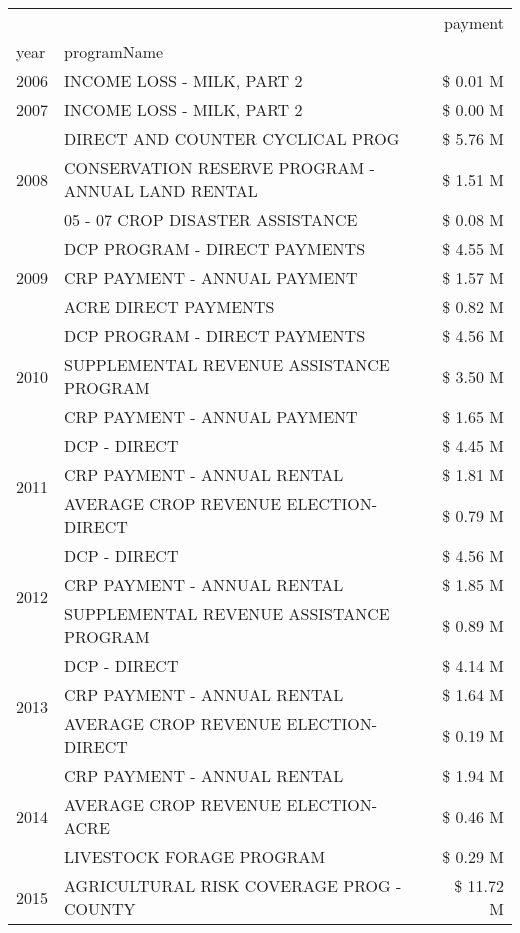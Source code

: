 \begin{tabular}{llr}
\toprule
 &  & payment \\
year & programName &  \\
\midrule
2006 & INCOME LOSS - MILK, PART 2 & \$ 0.01 M \\
\cline{1-3}
2007 & INCOME LOSS - MILK, PART 2 & \$ 0.00 M \\
\cline{1-3}
\multirow[t]{3}{*}{2008} & DIRECT AND COUNTER CYCLICAL PROG & \$ 5.76 M \\
 & CONSERVATION RESERVE PROGRAM - ANNUAL LAND RENTAL & \$ 1.51 M \\
 & 05 - 07 CROP DISASTER ASSISTANCE & \$ 0.08 M \\
\cline{1-3}
\multirow[t]{3}{*}{2009} & DCP PROGRAM - DIRECT PAYMENTS & \$ 4.55 M \\
 & CRP PAYMENT - ANNUAL PAYMENT & \$ 1.57 M \\
 & ACRE DIRECT PAYMENTS & \$ 0.82 M \\
\cline{1-3}
\multirow[t]{3}{*}{2010} & DCP PROGRAM - DIRECT PAYMENTS & \$ 4.56 M \\
 & SUPPLEMENTAL REVENUE ASSISTANCE PROGRAM & \$ 3.50 M \\
 & CRP PAYMENT - ANNUAL PAYMENT & \$ 1.65 M \\
\cline{1-3}
\multirow[t]{3}{*}{2011} & DCP - DIRECT & \$ 4.45 M \\
 & CRP PAYMENT - ANNUAL RENTAL & \$ 1.81 M \\
 & AVERAGE CROP REVENUE ELECTION-DIRECT & \$ 0.79 M \\
\cline{1-3}
\multirow[t]{3}{*}{2012} & DCP - DIRECT & \$ 4.56 M \\
 & CRP PAYMENT - ANNUAL RENTAL & \$ 1.85 M \\
 & SUPPLEMENTAL REVENUE ASSISTANCE PROGRAM & \$ 0.89 M \\
\cline{1-3}
\multirow[t]{3}{*}{2013} & DCP - DIRECT & \$ 4.14 M \\
 & CRP PAYMENT - ANNUAL RENTAL & \$ 1.64 M \\
 & AVERAGE CROP REVENUE ELECTION-DIRECT & \$ 0.19 M \\
\cline{1-3}
\multirow[t]{3}{*}{2014} & CRP PAYMENT - ANNUAL RENTAL & \$ 1.94 M \\
 & AVERAGE CROP REVENUE ELECTION-ACRE & \$ 0.46 M \\
 & LIVESTOCK FORAGE PROGRAM & \$ 0.29 M \\
\cline{1-3}
\multirow[t]{3}{*}{2015} & AGRICULTURAL RISK COVERAGE PROG - COUNTY & \$ 11.72 M \\

\end{tabular}
